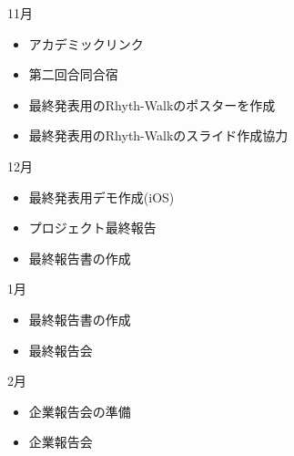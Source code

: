 11月
\begin{itemize}
\item アカデミックリンク
\item 第二回合同合宿
\item 最終発表用のRhyth-Walkのポスターを作成
\item 最終発表用のRhyth-Walkのスライド作成協力
\end{itemize}
12月
\begin{itemize}
\item 最終発表用デモ作成(iOS)
\item プロジェクト最終報告
\item 最終報告書の作成
\end{itemize}
1月
\begin{itemize}
\item 最終報告書の作成
\item 最終報告会
\end{itemize}
2月
\begin{itemize}
\item 企業報告会の準備
\item 企業報告会
\end{itemize}

